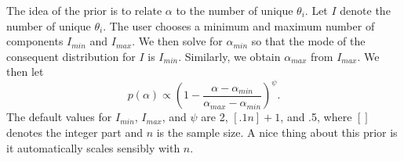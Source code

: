 The idea of the prior is to relate $\alpha$ to the number of unique $\theta_i$.
Let $I$ denote the number of unique $\theta_i$. 
The user chooses a minimum and maximum number of components $I_{min}$ and $I_{max}$.
We then solve for $\alpha_{min}$ so that the mode of the consequent distribution for $I$
is $I_{min}$.
Similarly, we obtain $\alpha_{max}$ from $I_{max}$.
We then let
$$
p(\alpha) \propto (1 - \frac{\alpha - \alpha_{min}}{\alpha_{max} - \alpha_{min}})^\psi.
$$
The default values for $I_{min}$, $I_{max}$, and $\psi$ are 2, $[.1n]+1$, and .5, where
$[]$ denotes the integer part  and $n$ is the sample size.
A nice thing about this prior is it automatically scales sensibly with $n$.



